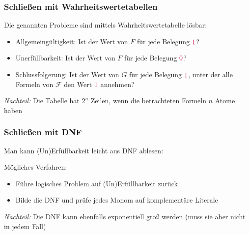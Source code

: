 \documentclass[onlymath]{beamer}
\begin{document}
\begin{frame}\frametitle{Schließen mit Wahrheitswertetabellen}

Die genannten Probleme sind mittels Wahrheitswertetabelle lösbar:%
\begin{itemize}
\item \alert{Allgemeingültigkeit:} Ist der Wert von $F$ für jede Belegung $\textcolor{purple}{1}$?
\item \alert{Unerfüllbarkeit:} Ist der Wert von $F$ für jede Belegung $\textcolor{purple}{0}$?
\item \alert{Schlussfolgerung:} Ist der Wert von $G$ für jede Belegung $\textcolor{purple}{1}$, unter der alle Formeln von $\mathcal{F}$ den Wert $\textcolor{purple}{1}$ annehmen?
\end{itemize}\pause

\emph{Nachteil:} Die Tabelle hat $2^n$ Zeilen, wenn die betrachteten Formeln $n$ Atome haben
\bigskip


\end{frame}

\begin{frame}[t]\frametitle{Schließen mit DNF}

Man kann (Un)Erfüllbarkeit leicht aus DNF ablesen:\medskip


Mögliches Verfahren:
\begin{itemize}
\item Führe logisches Problem auf (Un)Erfüllbarkeit zurück
\item Bilde die DNF und prüfe jedes Monom auf komplementäre Literale
\end{itemize}
\emph{Nachteil:} Die DNF kann ebenfalls exponentiell groß werden (muss sie aber nicht in jedem Fall)

\end{frame}
\end{document}
